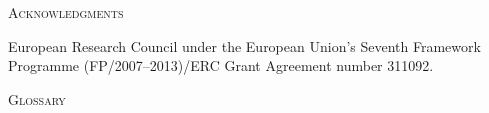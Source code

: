 \documentclass[12pt,letterpaper]{article}
\renewcommand{\section}[1]{%
\bigskip
\begin{center}
\begin{Large}
\normalfont\scshape #1
\medskip
\end{Large}
\end{center}}
\begin{document}



\section{Acknowledgments}
European Research Council under the European Union’s Seventh Framework Programme (FP/2007–2013)/ERC Grant Agreement number 311092.





\section{Glossary}
\end{document}
